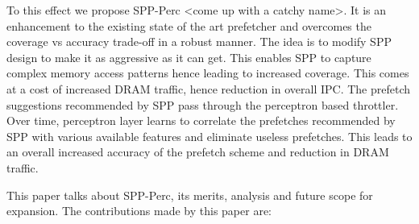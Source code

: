 \documentclass{sig-alternate}
\begin{document}
To this effect we propose SPP-Perc <come up with a catchy name>. 
It is an enhancement to the existing state of the art prefetcher and overcomes the coverage vs accuracy trade-off in a robust manner. 
The idea is to modify SPP design to make it as aggressive as it can get. 
This enables SPP to capture complex memory access patterns hence leading to increased coverage.
This comes at a cost of increased DRAM traffic, hence reduction in overall IPC.
The prefetch suggestions recommended by SPP pass through the perceptron based throttler. 
Over time, perceptron layer learns to correlate the prefetches recommended by SPP with various available features and eliminate useless prefetches. 
This leads to an overall increased accuracy of the prefetch scheme and reduction in DRAM traffic.

\vspace{1ex}This paper talks about SPP-Perc, its merits, analysis and future scope for expansion. 
The contributions made by this paper are:
\end{document}
